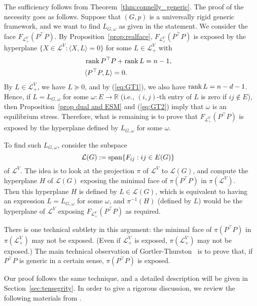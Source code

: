 \documentclass[11pt]{article}
\theoremstyle{definition}
\begin{document}
The sufficiency follows from Theorem~\ref{thm:connelly_generic}. 
The proof of the necessity goes as follows.
Suppose that $(G,p)$ is a universally rigid generic framework, and we want to find  $L_{G,\omega}$ as given in the statement.
We consider the face $F_{\mathcal{L}_+^V}(P^{\top}P)$. 
By Proposition~\ref{prop:realface}, $F_{\mathcal{L}_+^V}(P^{\top}P)$ is exposed by the hyperplane $\{X\in \mathcal{L}^V: \langle X, L\rangle=0\}$ for some $L\in \mathcal{L}^V_+$ with 
\begin{align}
&\rank P^{\top}P+\rank L=n-1, \label{eq:GT1}\\
&\langle P^{\top} P, L\rangle=0. \label{eq:GT2} 
\end{align}
 By $L\in \mathcal{L}^V_+$, we have $L\succeq 0$, and by (\ref{eq:GT1}), we also have $\rank L=n-d-1$.
 Hence, if $L=L_{G,\omega}$ for some $\omega:E\rightarrow \mathbb{R}$ (i.e., $(i,j)$-th entry of $L$ is zero if $ij\notin E$), 
 then Proposition~\ref{prop dual and ESM} and  (\ref{eq:GT2})  imply that $\omega$ is an equilibrium stress. 
Therefore, what is remaining is to prove that  $F_{\mathcal{L}_+^V}(P^{\top}P)$ is exposed by the hyperplane defined by $L_{G,\omega}$ for some $\omega$. 

To find such $L_{G,\omega}$, consider the subspace 
\[
\mathcal{L}(G):={\rm span}\{F_{ij}: ij\in E(G)\}
\]
of $\mathcal{L}^V$. 
The idea is to look at the projection $\pi$ of $\mathcal{L}^V$ to $\mathcal{L}(G)$,
and compute the hyperplane $H$ of $\mathcal{L}(G)$ exposing the minimal face of  $\pi(P^{\top}P)$ in $\pi(\mathcal{L}^V)$.
Then  this hyperplane $H$  is defined by $L\in \mathcal{L}(G)$, which is equivalent to having an expression $L=L_{G,\omega}$ for some $\omega$,
and $\pi^{-1}(H)$ (defined by $L$) would be the hyperplane of $\mathcal{L}^V$ exposing $F_{\mathcal{L}_+^V}(P^{\top}P)$  as required.

There is one technical subtlety in this argument: 
the minimal face of  $\pi(P^{\top}P)$ in $\pi(\mathcal{L}_+^V)$ may not be exposed. 
(Even if $\mathcal{L}_+^V$ is exposed, $\pi(\mathcal{L}_+^V)$ may not be exposed.)
The main technical observation of Gortler-Thurston~\cite{GT} is to prove that, if $P^{\top} P$ is generic in a certain sense, $\pi(P^{\top}P)$ is exposed.  

Our proof follows the same technique, and a detailed description will be given in Section~\ref{sec:tensegrity}. 
In order to give a rigorous discussion,  we review the following materials  from  \cite{GT}.
 
\end{document}
